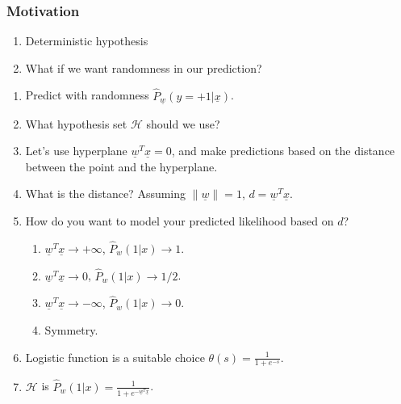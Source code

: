     \subsubsection{Motivation}
    \begin{example}
        \begin{enumerate}
            \item Deterministic hypothesis

            \item What if we want randomness in our prediction?
        \end{enumerate}    
    \end{example}

\begin{process}
    \begin{enumerate}
        \item Predict with randomness $\hat{P}_{\underline{w}} (y = +1| \underline{x})$.
        \item What hypothesis set $\mathcal{H}$ should we use?
        \item Let's use hyperplane $\underline{w}^T \underline{x} = 0$, and make predictions based on the distance between the point and the hyperplane.
        \item What is the distance? Assuming $\|\underline{w}\| = 1$, $d = \underline{w}^T \underline{x}$.
        \item How do you want to model your predicted likelihood based on $d$?
        \begin{enumerate}
            \item $\underline{w}^T \underline{x} \rightarrow +\infty$, $\hat{P}_w(1|x) \rightarrow 1$.
            \item $\underline{w}^T \underline{x} \rightarrow 0$, $\hat{P}_w(1|x) \rightarrow 1/2$.
            \item $\underline{w}^T \underline{x} \rightarrow -\infty$, $\hat{P}_w(1|x) \rightarrow 0$.
            \item Symmetry.
        \end{enumerate}
        \item Logistic function is a suitable choice $\theta(s) = \frac{1}{1 + e^{-s}}$.
        \item $\mathcal{H}$ is $\hat{P}_w(1|x) = \frac{1}{1 + e^{-\underline{w}^T \underline{x}}}$.
    \end{enumerate}    
\end{process}

